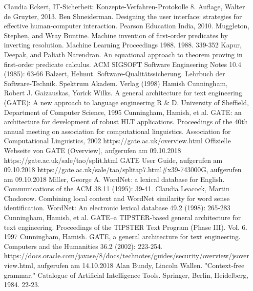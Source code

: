\documentclass[12pt]{report}
\begin{document}
\begin{thebibliography}{20}
Claudia Eckert, \glqq  IT-Sicherheit: Konzepte-Verfahren-Protokolle\grqq{}  8. Auflage, Walter de Gruyter, 2013.
Ben Shneiderman. Designing the user interface: strategies for effective human-computer interaction. Pearson Education India, 2010.
Muggleton, Stephen, and Wray Buntine. \glqq  Machine invention of first-order predicates by inverting resolution.\grqq{}  Machine Learning Proceedings 1988. 1988. 339-352
Kapur, Deepak, and Paliath Narendran. \glqq  An equational approach to theorem proving in first-order predicate calculus.\grqq{}  ACM SIGSOFT Software Engineering Notes 10.4 (1985): 63-66
Balzert, Helmut. \glqq  Software-Qualitätssicherung.\grqq{}  Lehrbuch der Software-Technik. Spektrum Akadem. Verlag (1998)
 Hamish Cunningham, Robert J. Gaizauskas, Yorick Wilks. A general architecture for text engineering (GATE): A new approach to language engineering R \& D. University of Sheffield, Department of Computer Science, 1995
 Cunningham, Hamish, et al. \glqq  GATE: an architecture for development of robust HLT applications.\grqq{}  Proceedings of the 40th annual meeting on association for computational linguistics. Association for Computational Linguistics, 2002
 https://gate.ac.uk/overview.html Offizielle Webseite von GATE (Overview), aufgerufen am 09.10.2018
 https://gate.ac.uk/sale/tao/split.html GATE User Guide, aufgerufen am 09.10.2018
 https://gate.ac.uk/sale/tao/splitap7.html\#x39-743000G, aufgerufen am 09.10.2018
Miller, George A. \glqq   WordNet: a lexical database for English.\grqq{}  Communications of the ACM 38.11 (1995): 39-41.
Claudia Leacock, Martin Chodorow. \glqq   Combining local context and WordNet similarity for word sense identification.\grqq{}  WordNet: An electronic lexical database 49.2 (1998): 265-283
Cunningham, Hamish, et al. \glqq   GATE–a TIPSTER-based general architecture for text engineering.\grqq{}  Proceedings of the TIPSTER Text Program (Phase III). Vol. 6. 1997
Cunningham, Hamish. \glqq   GATE, a general architecture for text engineering.\grqq{}  Computers and the Humanities 36.2 (2002): 223-254.
 https://docs.oracle.com/javase/8/docs/technotes/guides/security/overview/jsoverview.html, aufgerufen am 14.10.2018
 Alan Bundy, Lincoln Wallen. "Context-free grammar." Catalogue of Artificial Intelligence Tools. Springer, Berlin, Heidelberg, 1984. 22-23.
\end{thebibliography}
\end{document}
